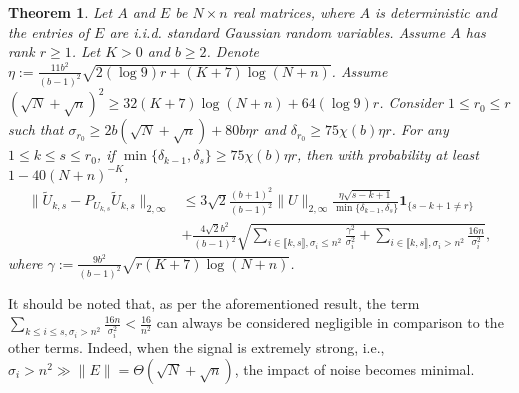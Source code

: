 \documentclass[reqno]{amsart}
\theoremstyle{plain}
\newtheorem{theorem}{Theorem}
\theoremstyle{definition}
\begin{document}
\begin{theorem}\label{thm:infinitybd} Let $A$ and $E$ be $N \times n$ real matrices, where $A$ is deterministic and the entries of $E$ are i.i.d. standard Gaussian random variables. Assume $A$ has rank $r \geq 1$. Let $K>0$ and $b\ge 2$. Denote $\eta:= \frac{11b^2}{(b-1)^2} \sqrt{2(\log 9) r+(K+7) \log (N+n)}$. Assume $(\sqrt N + \sqrt n)^2 \ge 32(K+7)\log(N+n) + 64(\log 9) r$. Consider $1\le r_0 \le r$ such that $ \sigma_{r_0} \ge 2b(\sqrt N+ \sqrt{n}) + 80 b\eta r$ and $\delta_{r_0}\geq 75\chi(b)\eta r$. For any $1\le k \le s \leq r_0$, if  $\min\{\delta_{k-1}, \delta_s\}\geq 75\chi(b)\eta r$,  then with probability at least $1 - 40(N+n)^{-K}$,
\begin{align}\label{infnorm}
\| \widetilde{U}_{k,s} - P_{U_{k,s}} \widetilde{U}_{k,s} \|_{2,\infty} &\le 3\sqrt{2}\frac{(b+1)^2}{(b-1)^2} \| U \|_{2,\infty}  \frac{\eta\sqrt{s-k+1}}{\min\{\delta_{k-1}, \delta_s\}} \mathbf{1}_{\{s-k+1\neq r \}} \nonumber\\
&  + \frac{4\sqrt{2} b^2}{(b-1)^2}\sqrt{\sum_{i\in \llbracket k, s\rrbracket, \sigma_i\le n^2} \frac{\gamma^2}{\sigma_i^2} + \sum_{i\in \llbracket k, s\rrbracket, \sigma_i> n^2} \frac{16 n}{\sigma_i^2}},
\end{align}
where $\gamma:= \frac{9 b^2}{(b-1)^2}\sqrt{r(K+7)\log(N+n)} $. 
\end{theorem}
It should be noted that, as per the aforementioned result, the term $\sum_{k\le i\le s, \sigma_i> n^2} \frac{16 n}{\sigma_i^2} < \frac{16}{n^2}$ can always be considered negligible in comparison to the other terms.  Indeed, when the signal is extremely strong, i.e., $\sigma_i>n^2 \gg \|E\|=\Theta(\sqrt N +\sqrt n)$, the impact of noise becomes minimal. 
\end{document}

